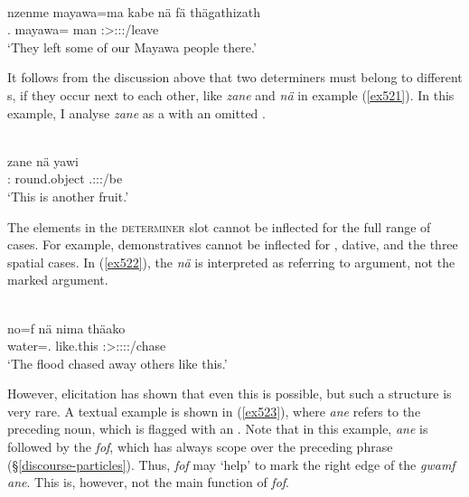 \begin{exe}
	\\
	\gll nzenme mayawa=ma kabe nä fä thägathizath\\
	\Fnsg.\Poss{} mayawa=\Char{} man \Indf{} \Dist{} \Stpl:\Sbj>\Stpl:\Obj:\Pst:\Ipfv/leave\\
	\trans `They left some of our Mayawa people there.'
	\label{ex553}
\end{exe}

It follows from the discussion above that two determiners must belong to different s, if they occur next to each other, like \emph{zane} and \emph{nä} in example (\ref{ex521}). In this example, I analyse \emph{zane} as a  with an omitted .

\begin{exe}
	\\
	\gll zane nä yawi \\
	\Dem:\Prox{} \Indf{} {round.object} \Tsg.\Masc:\Sbj:\Nonpast:\Ipfv/be\\
	\trans `This is another fruit.'
	\label{ex521}
\end{exe}

The elements in the \textsc{determiner} slot cannot be inflected for the full range of cases. For example, demonstratives cannot be inflected for , dative,  and the three spatial cases. In (\ref{ex522}), the  \emph{nä} is interpreted as referring to  argument, not the  marked argument.

\begin{exe}
	\\
	\gll no=f nä nima thäako\\
	water=\Erg.\Sg{} \Indf{} {like.this} \Stsg:\Sbj>\Stpl:\Obj:\Pst:\Pfv:\Andat/chase\\
	\trans `The flood chased away others like this.'
	\label{ex522}
\end{exe}

However, elicitation has shown that even this is possible, but such a structure is very rare. A textual example is shown in (\ref{ex523}), where \emph{ane} refers to the preceding noun, which is flagged with an . Note that in this example, \emph{ane} is followed by the   \emph{fof}, which has always scope over the preceding phrase (\S{}\ref{discourse-particles}). Thus, \emph{fof} may `help' to mark the right edge of the  \emph{gwamf ane}. This is, however, not the main function of \emph{fof}.

